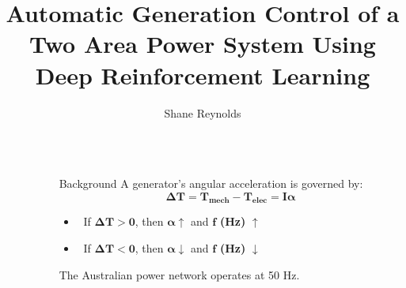 \documentclass[final]{beamer}
\title{Automatic Generation Control of a Two Area Power System Using Deep Reinforcement Learning} %
\author{Shane Reynolds} %
\institute{Charles Darwin University} %
\newlength{\sepwid}
\newlength{\onecolwid}
\begin{document}

\setlength{\belowcaptionskip}{2ex} %
\setlength\belowdisplayshortskip{2ex} %

\begin{frame}[t] %

\begin{columns}[t] %

\begin{column}{\sepwid}\end{column} %

\begin{column}{\onecolwid} %


\begin{block}{Background}
A generator's angular acceleration is governed by:
\begin{equation*}
	\boldsymbol{\Delta T = T_{mech} - T_{elec} = I \alpha}
\end{equation*}
\vspace{-2cm}
\begin{itemize}
	\setlength{\itemindent}{1em}
	\item \ If $\boldsymbol{\Delta T > 0}$, then $\boldsymbol{\alpha \uparrow}$ and $\boldsymbol{f}$ \textbf{(Hz)} $\uparrow$
	\item \ If $\boldsymbol{\Delta T < 0}$, then $\boldsymbol{\alpha \downarrow}$ and $\boldsymbol{f}$ \textbf{(Hz)} $\downarrow$
\end{itemize}
The Australian power network operates at 50 Hz.
\end{block}




\end{column}
\end{columns}
\end{frame}
\end{document}
